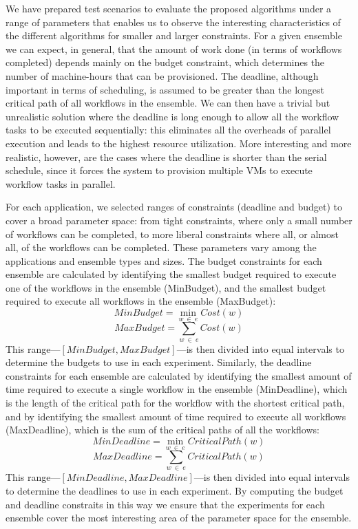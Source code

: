 \documentclass[conference]{IEEEtran}
\begin{document}
We have prepared test scenarios to evaluate the proposed algorithms under a
range of parameters that enables us to observe the interesting characteristics
of the different algorithms for smaller and larger constraints. For a given
ensemble we can expect, in general, that the amount of work done (in terms of
workflows completed) depends mainly on the budget constraint, which determines
the number of machine-hours that can be provisioned. The deadline, although
important in terms of scheduling, is assumed to be greater than the longest critical
path of all workflows in the ensemble. We can then have a trivial but unrealistic solution
where the deadline  is long enough to allow all the workflow tasks to be
executed sequentially: this eliminates all the overheads of parallel execution
and leads to the highest resource utilization. More interesting and more
realistic, however, are the cases where the deadline is shorter than the serial
schedule, since it forces the system to provision multiple VMs to execute
workflow tasks in parallel.

For each application, we selected ranges of constraints (deadline and budget) to cover a broad parameter space: from tight constraints, where only a small number of workflows can be completed, to more liberal constraints where all, or almost all, of the workflows can be completed. These parameters vary among the applications and ensemble types and sizes. The budget constraints for each ensemble are calculated by identifying the smallest budget required to execute one of the workflows in the ensemble (MinBudget), and the smallest budget required to execute all workflows in the ensemble (MaxBudget): 
%
$$
MinBudget = \min_{w\ \in\ e}{Cost(w)}
$$
$$
MaxBudget = \sum_{w\ \in\ e}{Cost(w)}
$$
%
This range---$[MinBudget, MaxBudget]$---is then divided into equal intervals to determine the budgets to use in each experiment. Similarly, the deadline constraints for each ensemble are calculated by identifying the smallest amount of time required to execute a single workflow in the ensemble (MinDeadline), which is the length of the critical path for the workflow with the shortest critical path, and by identifying the smallest amount of time required to execute all workflows (MaxDeadline), which is the sum of the critical paths of all the workflows:
%
$$
MinDeadline = \min_{w\ \in\ e}{CriticalPath(w)}
$$
$$
MaxDeadline = \sum_{w\ \in\ e}{CriticalPath(w)}
$$
%
This range---$[MinDeadline, MaxDeadline]$---is then divided into equal intervals to determine the deadlines to use in each experiment. By computing the budget and deadline constraits in this way we ensure that the experiments for each ensemble cover the most interesting area of the parameter space for the ensemble.
\end{document}
